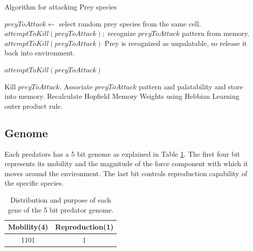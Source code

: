 \begin{algorithm}
	\caption{Algorithm for attacking Prey species}
	\label{algo:algorithm-attack-prey}
	\begin{algorithmic}
				\STATE $preyToAttack \gets$ select random prey species from the same cell.
					\STATE $attemptToKill(preyToAttack);$ 
				\ELSE
					\STATE recognize $preyToAttack$ pattern from memory.
						\STATE $attemptToKill(preyToAttack)$
					\ELSE 
						\STATE Prey is recognized as unpalatable, so release it back into environment.
					\ENDIF
				\ENDIF
			\ENDIF
		\ENDFOR
	\end{algorithmic}
\end{algorithm}

\begin{algorithm}
	\caption{$attemptToKill(preyToAttack)$}
	\label{algo:algorithm-attemptToKill}
	\begin{algorithmic}
		\STATE Kill $preyToAttack$.
		\IF {Memory size $< MaxMemorySize$}
			\STATE Associate $preyToAttack$ pattern and palatability and store into memory.
			\STATE Recalculate Hopfield Memory Weights using Hebbian Learning outer product rule.
		\ENDIF
	\end{algorithmic}	
\end{algorithm}

\subsection{Genome}
Each predators has a 5 bit genome as explained in Table \ref{tab:predator-genome}. The first four bit represents its mobility and the magnitude of the force component with which it moves around the environment. The last bit controls reproduction capability of the specific species.

\begin{table}[H]
\centering
\begin{tabular}{|c|c|}
	\hline
		\textbf{Mobility(4)} & \textbf{Reproduction(1)} \\ \hline
				 1101					   &					1						 		\\ \hline
\end{tabular}
\caption{Distribution and purpose of each gene of the 5 bit predator genome.}
\label{tab:predator-genome}
\end{table}

